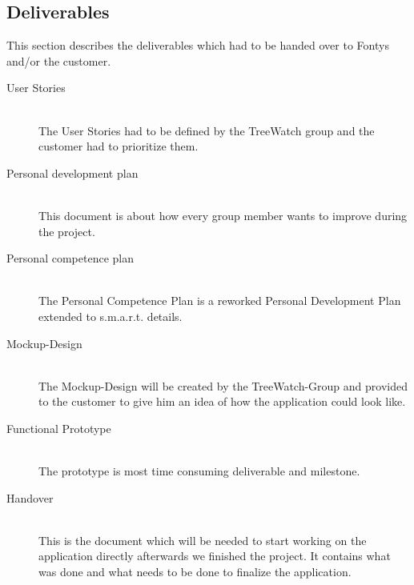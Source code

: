 \subsection{Deliverables}
This section describes the deliverables which had to be handed over to Fontys and/or the customer.
\begin{description}
	\item[User Stories] \hfill \\
	The User Stories had to be defined by the TreeWatch group and the customer had to prioritize them.
	\item[Personal development plan] \hfill \\
	This document is about how every group member wants to improve during the project.
	\item[Personal competence plan] \hfill \\
	The Personal Competence Plan is a reworked Personal Development Plan extended to s.m.a.r.t. details.
	\item[Mockup-Design] \hfill \\
	The Mockup-Design will be created by the TreeWatch-Group and provided to the customer to give him an idea of how the application could look like.
	\item[Functional Prototype] \hfill \\
	The prototype is most time consuming deliverable and milestone. 
	\item[Handover] \hfill \\
	This is the document which will be needed to start working on the application directly afterwards we finished the project. It contains what was done and what needs to be done to finalize the application.
\end{description}